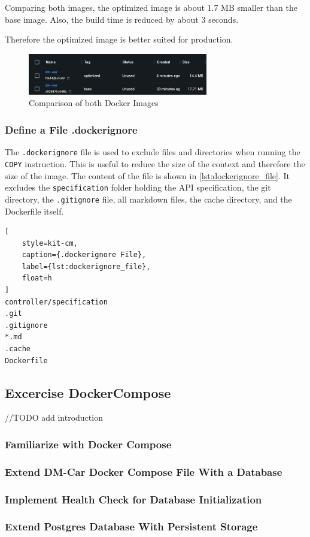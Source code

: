 Comparing both images, the optimized image is about 1.7 MB smaller than the base image.
Also, the build time is reduced by about 3 seconds.

Therefore the optimized image is better suited for production.

\begin{figure}
    \centering
    \includegraphics[width=0.7\textwidth]{figures/microservices/dmCar/ms_dmCar_optimizedComparison.png}
    \caption{Comparison of both Docker Images}
    \label{fig:docker_image_comparison}
\end{figure}

\subsubsection*{Define a File .dockerignore}
The \texttt{.dockerignore} file is used to exclude files and directories when running the \texttt{COPY} instruction.
This is useful to reduce the size of the context and therefore the size of the image.
The content of the file is shown in \autoref*{lst:dockerignore_file}.
It excludes the \texttt{specification} folder holding the API specification, the git directory, the \texttt{.gitignore} file, all markdown files, the cache directory, and the Dockerfile itself.

\begin{lstlisting}[
    style=kit-cm,
    caption={.dockerignore File},
    label={lst:dockerignore_file},
    float=h
]
controller/specification
.git
.gitignore
*.md
.cache
Dockerfile
\end{lstlisting}

\subsection{Excercise DockerCompose}
//TODO add introduction
\subsubsection*{Familiarize with Docker Compose}

\subsubsection*{Extend DM-Car Docker Compose File With a Database}

\subsubsection*{Implement Health Check for Database Initialization}

\subsubsection*{Extend Postgres Database With Persistent Storage}